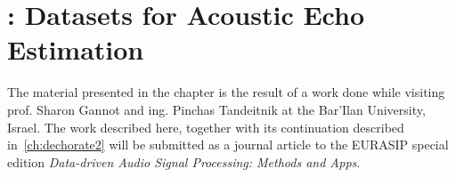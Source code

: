 \chapter{: Datasets for Acoustic Echo Estimation}\label{ch:dechorate}

\vspace{-2.5em}

 \synopsisChDechorate


\mynewline
The material presented in the chapter is the result of a work done while visiting prof. Sharon Gannot and ing. Pinchas Tandeitnik at the Bar'Ilan University, Israel.
The work described here, together with its continuation described in~\cref{ch:dechorate2} will be submitted as a journal article to the EURASIP special edition \textit{Data-driven Audio Signal Processing: Methods and Apps}.


